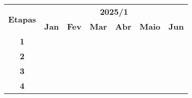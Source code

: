 \vspace{0.5cm}
{
	\noindent \begin{tabular}{|c|c|c|c|c|c|c|}
		\hline
		\multirow{2}{*}{\textbf{\small{Etapas}}} & \multicolumn{6}{|c|}{\textbf{\small{2025/1}}}                                                                                                                 \\
		\cline{2-7}
		                                         & \textbf{Jan}     & \textbf{Fev}     & \textbf{Mar}     & \textbf{Abr}     & \textbf{Maio}    & \textbf{Jun}     \\
		\hline
		\textbf{\small{1}}                       & \cellcolor{gray} & \cellcolor{gray} &                  &                  &                  &                  \\
		\hline
		\textbf{\small{2}}                       &                  & \cellcolor{gray} & \cellcolor{gray} &                  &                  &                  \\
		\hline
		\textbf{\small{3}}                       &                  &                  & \cellcolor{gray} & \cellcolor{gray} & \cellcolor{gray} &                  \\
		\hline
		\textbf{\small{4}}                       &                  &                  &                  &                  & \cellcolor{gray} & \cellcolor{gray} \\
		\hline
	\end{tabular}
}

% 
% 
% 
